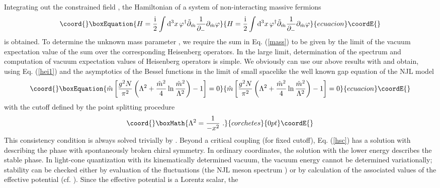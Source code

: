 \documentclass[a4paper,12pt]{article}
\begin{document}
Integrating out the constrained field \myHighlight{$\chi$}\coordHE{}, the Hamiltonian of a system of non-interacting massive
fermions
\begin{equation}\coord{}\boxEquation{
\label{lcha}
H =\frac{{\rm i}}{2}\int {\rm d}^{3} x\,\varphi^{\dagger}\tilde{\partial}_{\hat{m}}\frac{1}
{\partial_{-}}\partial_{\hat{m}}\varphi
}{
H =\frac{{\rm i}}{2}\int {\rm d}^{3} x\,\varphi^{\dagger}\tilde{\partial}_{\hat{m}}\frac{1}
{\partial_{-}}\partial_{\hat{m}}\varphi
}{ecuacion}\coordE{}\end{equation}
is obtained. To determine the unknown mass parameter \coordHE{}, we require the sum  in
Eq. (\ref{mass}) to be given by the limit of the vacuum expectation value of the sum over the
corresponding Heisenberg operators.
In the large \coordHE{} limit, determination of the  spectrum and computation of  vacuum expectation
values of Heisenberg operators is simple. We obviously can use our above results with \coordHE{}
and obtain, using Eq. (\ref{hei1}) and the asymptotics of the Bessel functions in the limit of
small spacelike \coordHE{}   the well known  gap equation of the NJL model
\begin{equation}\coord{}\boxEquation{
\label{hsc}
\hat{m}\left[\frac{g^2 N}{\pi^{2}} \left(\Lambda^{2} +\frac{\hat{m}^2}{4}\ln
\frac{\hat{m}^2}{\Lambda^2}\right)-1\right]=0}{
\hat{m}\left[\frac{g^2 N}{\pi^{2}} \left(\Lambda^{2} +\frac{\hat{m}^2}{4}\ln
\frac{\hat{m}^2}{\Lambda^2}\right)-1\right]=0}{ecuacion}\coordE{}\end{equation}
with  the cutoff \myHighlight{$\Lambda$}\coordHE{} defined by the point splitting procedure
\begin{displaymath}\coord{}\boxMath{
\Lambda^2 = \frac{1}{-x^2}\ .
}{corchetes}{0pt}\coordE{}\end{displaymath}
This consistency condition is always solved trivially by \coordHE{}. Beyond a critical coupling
(for fixed cutoff), Eq. (\ref{hsc}) has a solution with \coordHE{} describing the phase with
spontaneously broken chiral symmetry. In ordinary coordinates, the solution with the lower energy
describes the stable phase. In light-cone quantization with its kinematically determined vacuum, the
vacuum energy cannot be determined variationally; stability can be checked either by evaluation of
the fluctuations (the NJL meson spectrum \cite{LOTY00}) or by calculation of the associated values of
 the effective potential (cf. \cite{MIRA93}). Since the effective potential is a Lorentz scalar, the
\end{document}
